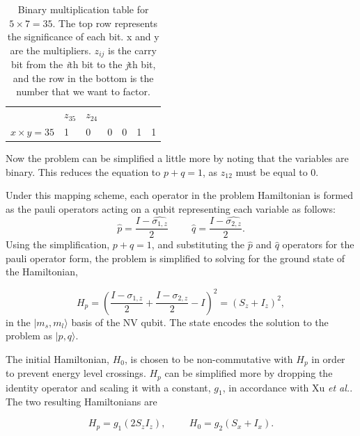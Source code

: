 \documentclass[%
 reprint,
 amsmath,amssymb,
 aps,
]{revtex4-1}
\begin{document}
\begin{table}
\begin{flushleft}
\begin{tabular}{ p{1.7cm}  p{1cm} p{1cm} p{1cm} p{1cm} p{1cm} p{1cm}}
\hspace{0.1cm} &$z_{35}$ &$z_{24}$ &\hspace{0.1cm}  &\hspace{0.1cm} &\hspace{0.1cm} &\hspace{0.1cm} \\ 

$x \times y = 35$ &1 &0 &0 &0 &1 &1 \\ 
\hline
\end{tabular}
\end{flushleft}
\caption{Binary multiplication table for $ 5 \times 7 = 35 $. The top row represents the significance of each bit. x and y are the multipliers. $z_{ij}$ is the carry bit from the \textit{i}th bit to the \textit{j}th bit, and the row in the bottom is the number that we want to factor\cite{Xu2017}.
}
\label{tab:binmult}
\end{table}


	 Now the problem can be simplified a little more by noting that the variables are binary. This reduces the equation to $p+q=1$, as $z_{12}$ must be equal to 0.	 
	 
	  Under this mapping scheme, each operator in the problem Hamiltonian is formed as the pauli operators acting on a qubit representing each variable as follows:
	\begin{equation}
	  \hat{p} = \dfrac{I-\hat{\sigma_{1,z}}}{2} \hspace{1cm}   \hat{q} = \dfrac{I-\hat{\sigma_{2,z}}}{2}.
	\end{equation}
Using the simplification, $p+q=1$, and substituting the $\hat{p}$ and $\hat{q}$ operators for the pauli operator form, the problem is simplified to solving for the ground state of the Hamiltonian,
	
\begin{equation}
	H_p = \left( \dfrac{I-\sigma_{1,z}}{2} + \dfrac{I-\sigma_{2,z}}{2} - I\right)^2 = \left(S_z + I_z \right)^2 ,
\end{equation}
in the $\vert m_s,m_l \rangle$ basis of the NV qubit. The state encodes the solution to the problem as   $\vert p,q \rangle$.

	The initial Hamiltonian, $H_0$, is chosen to be non-commutative with $H_p$ in order to prevent energy level crossings. $H_p$ can be simplified more by dropping the identity operator and scaling it with a constant, $g_1$, in accordance with Xu \textit{et al.}. The two resulting Hamiltonians are

\begin{equation}
	H_p = g_1\left(2S_zI_z\right), \hspace{1cm} H_0 = g_2\left(S_x + I_x\right) .
\end{equation}
\end{document}
